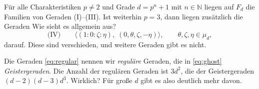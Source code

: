 \begin{theorem}[Geistergeraden]
Für alle Charakteristiken $p \neq 2$ und Grade $d = p^n + 1$ mit $n \in \mathbb N$ liegen auf $F_d$ die Familien von Geraden (I)--(III). Ist weiterhin $p=3$, dann liegen zusätzlich die Geraden \note Wie sieht es allgemein aus?
\begin{equation} \label{eq:ghost}
\text{(IV)}\qquad \langle (1:0:\zeta:\eta),\; (0,\theta,\zeta,-\eta)\rangle, \qquad \theta, \zeta, \eta \in \mu_d,
\end{equation}
darauf. Diese sind verschieden, und weitere Geraden gibt es nicht.
\end{theorem}
\begin{remarks}
Die Geraden \eqref{eq:regular} nennen wir \emph{reguläre} Geraden, die in \eqref{eq:ghost} \emph{Geistergeraden}. Die Anzahl der regulären Geraden ist $3d^2$, die der Geistergeraden $(d-2)(d-3)d^3$. \note Wirklich? Für große $d$ gibt es also deutlich mehr davon.
\end{remarks}
